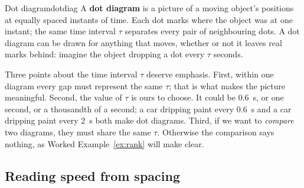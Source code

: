 \documentclass[11pt,twoside,openany]{book}
\begin{document}
\begin{definition}{Dot diagram}{dotdiag}
A \textbf{dot diagram} is a picture of a moving object's positions at equally spaced instants of time. Each dot marks where the object was at one instant; the same time interval $\tau$ separates every pair of neighbouring dots. A dot diagram can be drawn for anything that moves, whether or not it leaves real marks behind: imagine the object dropping a dot every $\tau$ seconds.
\end{definition}

Three points about the time interval $\tau$ deserve emphasis. First, within one diagram every gap must represent the same $\tau$; that is what makes the picture meaningful. Second, the value of $\tau$ is ours to choose. It could be \SI{0.6}{\second}, or one second, or a thousandth of a second; a car dripping paint every \SI{0.6}{\second} and a car dripping paint every \SI{2}{\second} both make dot diagrams. Third, if we want to \emph{compare} two diagrams, they must share the same $\tau$. Otherwise the comparison says nothing, as Worked Example~\ref{ex:rank} will make clear.

\subsection{Reading speed from spacing}
\end{document}
